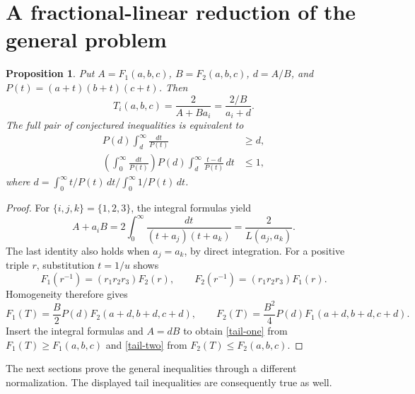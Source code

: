 \documentclass[11pt]{article}
\newtheorem{proposition}{Proposition}
\begin{document}
\section{A fractional-linear reduction of the general problem}
\begin{proposition}
Put $A=F_1(a,b,c)$, $B=F_2(a,b,c)$, $d=A/B$, and
$P(t)=(a+t)(b+t)(c+t)$. Then
\[
 T_i(a,b,c)=\frac{2}{A+B a_i}=\frac{2/B}{a_i+d}.
\]
The full pair of conjectured inequalities is equivalent to
\begin{align}
 P(d)\int_d^\infty\frac{dt}{P(t)}&\geq d,\label{tail-one}\\
 \left(\int_0^\infty\frac{dt}{P(t)}\right)P(d)
 \int_d^\infty\frac{t-d}{P(t)}\,dt&\leq1,\label{tail-two}
\end{align}
where $d=\int_0^\infty t/P(t)\,dt\big/\int_0^\infty1/P(t)\,dt$.
\end{proposition}
\begin{proof}
For $\{i,j,k\}=\{1,2,3\}$, the integral formulas yield
\[
 A+a_iB=2\int_0^\infty\frac{dt}{(t+a_j)(t+a_k)}
 =\frac{2}{L(a_j,a_k)}.
\]
The last identity also holds when $a_j=a_k$, by direct integration.
For a positive triple $r$, substitution $t=1/u$ shows
\[
 F_1(r^{-1})=(r_1r_2r_3)F_2(r),\qquad
 F_2(r^{-1})=(r_1r_2r_3)F_1(r).
\]
Homogeneity therefore gives
\[
 F_1(T)=\frac B2 P(d)F_2(a+d,b+d,c+d),\qquad
 F_2(T)=\frac{B^2}{4}P(d)F_1(a+d,b+d,c+d).
\]
Insert the integral formulas and $A=dB$ to obtain
\eqref{tail-one} from $F_1(T)\geq F_1(a,b,c)$ and
\eqref{tail-two} from $F_2(T)\leq F_2(a,b,c)$.
\end{proof}
The next sections prove the general inequalities through a different
normalization. The displayed tail inequalities are consequently true as well.
\end{document}
